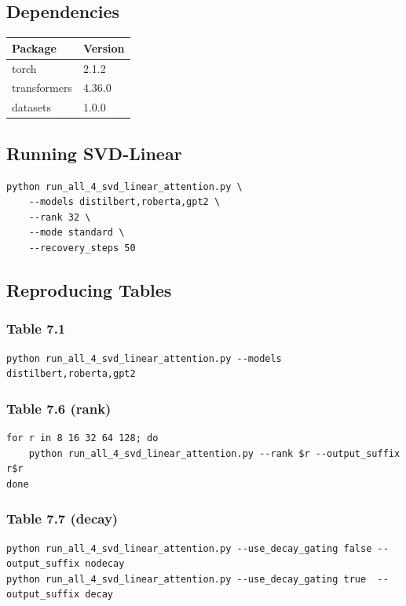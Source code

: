 \subsection{Dependencies}

\begin{table}[H]
\centering
\small
\begin{tabular}{ll}
\toprule
\textbf{Package} & \textbf{Version} \\
\midrule
torch & 2.1.2 \\
transformers & 4.36.0 \\
datasets & 1.0.0 \\
\bottomrule
\end{tabular}
\end{table}

\subsection{Running SVD-Linear}

\begin{lstlisting}
python run_all_4_svd_linear_attention.py \
    --models distilbert,roberta,gpt2 \
    --rank 32 \
    --mode standard \
    --recovery_steps 50
\end{lstlisting}

\subsection{Reproducing Tables}

\subsubsection{Table 7.1}
\begin{lstlisting}
python run_all_4_svd_linear_attention.py --models distilbert,roberta,gpt2
\end{lstlisting}

\subsubsection{Table 7.6 (rank)}
\begin{lstlisting}
for r in 8 16 32 64 128; do
    python run_all_4_svd_linear_attention.py --rank $r --output_suffix r$r
done
\end{lstlisting}

\subsubsection{Table 7.7 (decay)}
\begin{lstlisting}
python run_all_4_svd_linear_attention.py --use_decay_gating false --output_suffix nodecay
python run_all_4_svd_linear_attention.py --use_decay_gating true  --output_suffix decay
\end{lstlisting}

